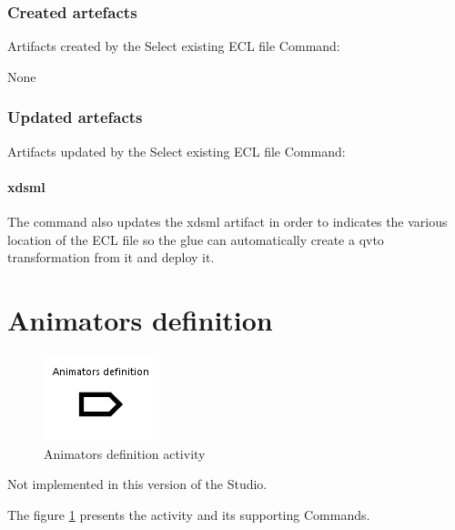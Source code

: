 \documentclass{gemoc} %
\begin{document}
\subsubsection{Created artefacts}
Artifacts created by the Select existing ECL file Command:

	None
\subsubsection{Updated artefacts}
Artifacts updated by the Select existing ECL file Command:
\paragraph{xdsml} 
The command also updates the xdsml artifact in order to indicates the various location of the ECL file so the glue can automatically create a qvto transformation from it and deploy it.

\section{Animators definition}
\label{sec:Animators_definition}
\begin{figure}[h]
		\center
		\includegraphics*[trim=0.0cm 0.0cm 0cm 0.0cm, clip=true]{fig/Animators_definition}
		\caption{Animators definition activity}
		\label{fig:Animators_definition}
\end{figure}

Not implemented in this version of the Studio.

The figure \ref{fig:Animators_definition} presents the activity and its supporting Commands.


\end{document}
